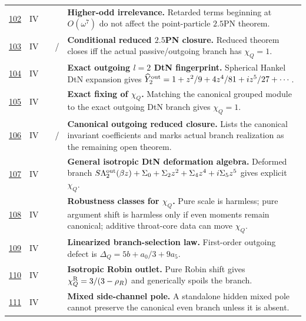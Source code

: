{\begin{longtable}{@{}L{0.055\textwidth}L{0.075\textwidth}L{0.145\textwidth}L{0.235\textwidth}L{0.43\textwidth}@{}}
\addlinespace
\hyperref[stage:102]{102} & IV &  & \StatusExactClosure{} & \textbf{Higher-odd irrelevance.} Retarded terms beginning at \(O(\omega^7)\) do not affect the point-particle \(2.5\)PN theorem. \\
\addlinespace
\hyperref[stage:103]{103} & IV &  & \StatusExactClosure{} / \StatusOpen{} & \textbf{Conditional reduced \(2.5\)PN closure.} Reduced theorem closes iff the actual passive/outgoing branch has \(\chi_Q=1\). \\
\addlinespace
\hyperref[stage:104]{104} & IV &  & \StatusExactClosure{} & \textbf{Exact outgoing \(l=2\) DtN fingerprint.} Spherical Hankel DtN expansion gives \(\widehat Y_2^{\rm out}=1+z^2/9+4z^4/81+iz^5/27+\cdots\). \\
\addlinespace
\hyperref[stage:105]{105} & IV &  & \StatusExactClosure{} & \textbf{Exact fixing of \(\chi_Q\).} Matching the canonical grouped module to the exact outgoing DtN branch gives \(\chi_Q=1\). \\
\addlinespace
\hyperref[stage:106]{106} & IV &  & \StatusExactClosure{} / \StatusOpen{} & \textbf{Canonical outgoing reduced closure.} Lists the canonical invariant coefficients and marks actual branch realization as the remaining open theorem. \\
\addlinespace
\hyperref[stage:107]{107} & IV &  & \StatusExactClosure{} & \textbf{General isotropic DtN deformation algebra.} Deformed branch \(S\Lambda_2^{\rm out}(\beta z)+\Sigma_0+\Sigma_2z^2+\Sigma_4z^4+i\Sigma_5z^5\) gives explicit \(\chi_Q\). \\
\addlinespace
\hyperref[stage:108]{108} & IV &  & \StatusExactClosure{} & \textbf{Robustness classes for \(\chi_Q\).} Pure scale is harmless; pure argument shift is harmless only if even moments remain canonical; additive throat-core data can move \(\chi_Q\). \\
\addlinespace
\hyperref[stage:109]{109} & IV &  & \StatusExactClosure{} & \textbf{Linearized branch-selection law.} First-order outgoing defect is \(\Delta_Q=5b+a_0/3+9a_5\). \\
\addlinespace
\hyperref[stage:110]{110} & IV &  & \StatusExactClosure{} & \textbf{Isotropic Robin outlet.} Pure Robin shift gives \(\chi_Q^{\rm R}=3/(3-\rho_R)\) and generically spoils the branch. \\
\addlinespace
\hyperref[stage:111]{111} & IV &  & \StatusExactClosure{} & \textbf{Mixed side-channel pole.} A standalone hidden mixed pole cannot preserve the canonical even branch unless it is absent. \\

\end{longtable}}

